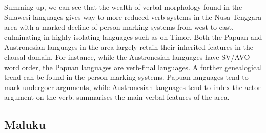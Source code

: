Summing up, we can see that the wealth of verbal morphology found in the Sulawesi languages gives way to more reduced verb systems in the Nusa Tenggara area with a marked decline of person-marking systems from west to east, culminating in highly isolating languages such as  on Timor. Both the Papuan and Austronesian languages in the area largely retain their inherited features in the clausal domain. For instance, while the Austronesian languages have SV/AVO word order, the Papuan languages are verb-final languages. A further genealogical trend can be found in the person-marking systems. Papuan languages tend to mark undergoer arguments, while Austronesian languages tend to index the actor argument on the verb.  summarises the main verbal features of the area.

\begin{table}[h]
\caption[Basic verbal features of Nusa Tenggara languages]{Overview of basic verbal features of the Nusa Tenggara languages in the EI data set. Constituent order lists only the basic pattern, pragmatically induced alternative patterns are often also possible. Brackets around person marking formulae indicate that the system does not apply to all verbs in all contexts. Grouping of languages is roughly according to the discussion in the prose.}
\label{table:overviewnusa}
\end{table}

\subsection{Maluku} \label{sec:maluku}

